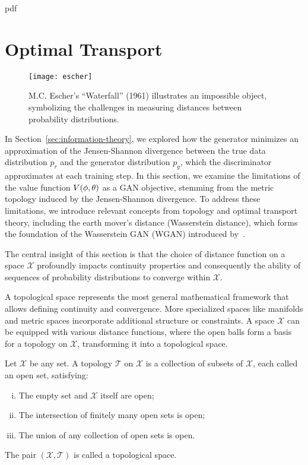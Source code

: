 pdf\section{Optimal Transport}%
\label{sec:optimal-transport}
\vspace{1cm}
\begin{figure}[h]%
	\label{fig:paradise}
	\centering
	 {
		\texttt{[image: escher]}
	}
	\caption{M.C. Escher's ``Waterfall'' (1961) illustrates an impossible object, symbolizing the challenges in measuring distances between probability distributions.}
\end{figure}
\vspace{1cm}
\noindent In Section~\ref{sec:information-theory}, we explored how the generator minimizes an approximation of the Jensen-Shannon divergence between the true data distribution $p_r$ and the generator distribution $p_g$, which the discriminator approximates at each training step. In this section, we examine the limitations of the value function $V(\phi, \theta)$ as a GAN objective, stemming from the metric topology induced by the Jensen-Shannon divergence. To address these limitations, we introduce relevant concepts from topology and optimal transport theory, including the earth mover's distance (Wasserstein distance), which forms the foundation of the Wasserstein GAN (WGAN) introduced by~\cite{ref:arjovsky-2017}.

The central insight of this section is that the choice of distance function on a space $\mathcal{X}$ profoundly impacts continuity properties and consequently the ability of sequences of probability distributions to converge within $\mathcal{X}$.

A topological space represents the most general mathematical framework that allows defining continuity and convergence. More specialized spaces like manifolds and metric spaces incorporate additional structure or constraints. A space $\mathcal{X}$ can be equipped with various distance functions, where the open balls form a basis for a topology on $\mathcal{X}$, transforming it into a topological space.

\begin{definition}%
	\label{def:topology1}
	Let $\mathcal{X}$ be any set. A \textnormal{\sffamily topology} $\mathcal{T}$ on $\mathcal{X}$ is a
	collection of subsets of $\mathcal{X}$, each called an open set, satisfying:
	\begin{enumerate}[(i)]
		\item The empty set and $\mathcal{X}$ itself are open;
		\item The intersection of finitely many open sets is open;
		\item The union of any collection of open sets is open.
	\end{enumerate}
	The pair $(\mathcal{X}, \mathcal{T})$ is called a \textnormal{\sffamily topological space}.
\end{definition}

